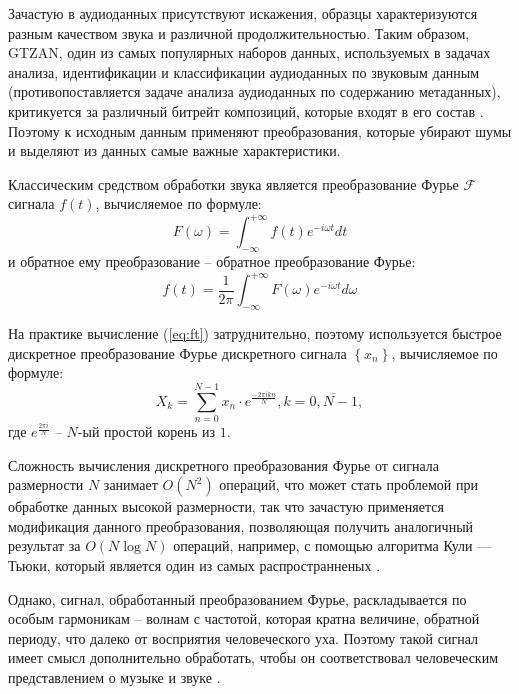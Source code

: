 Зачастую в аудиоданных присутствуют искажения, образцы характеризуются разным качеством звука и различной продолжительностью. 
Таким образом, GTZAN, один из самых популярных наборов данных, используемых в задачах анализа, идентификации и классификации аудиоданных по
звуковым данным (противопоставляется задаче анализа аудиоданных по содержанию метаданных), критикуется за различный битрейт композиций, которые входят в его состав \cite{gtzan}.
Поэтому к исходным данным применяют преобразования, которые убирают шумы и выделяют из данных самые важные характеристики.

Классическим средством обработки звука является преобразование Фурье $\mathcal{F}$ сигнала $f(t)$, вычисляемое по формуле:
\begin{equation} \label{eq:ft}
	F(\omega) = \int_{-\infty}^{+\infty} f(t) e ^ {-i \omega t} dt
\end{equation} и обратное ему преобразование -- обратное преобразование Фурье:
\begin{equation}
	f(t) = \frac{1}{2\pi} \int_{-\infty}^{+\infty} F(\omega) e^{-i \omega t} d\omega
\end{equation}

На практике вычисление (\ref{eq:ft}) затруднительно, поэтому используется быстрое дискретное преобразование Фурье дискретного сигнала $\left\{x_n\right\}$, вычисляемое по формуле:
\begin{equation}
	X_k = \sum_{n=0}^{N-1} x_n \cdot e^\frac{-2\pi i kn}{N}, k=\overline{0, N-1},
\end{equation}
где $e^{\frac{2\pi i}{N}}$ -- $N$-ый простой корень из $1$.

Сложность вычисления дискретного преобразования Фурье от сигнала размерности $N$ занимает $O(N^2)$ операций, что может стать проблемой при обработке
данных высокой размерности, так что зачастую применяется модификация данного преобразования, позволяющая получить аналогичный результат
за $O(N\log N )$ операций, например, с помощью алгоритма Кули — Тьюки, который является один из самых распространненых \cite{fft}.

Однако, сигнал, обработанный преобразованием Фурье, раскладывается по особым гармоникам -- волнам с частотой, которая кратна величине, обратной периоду, что далеко от восприятия человеческого уха.
Поэтому такой сигнал имеет смысл дополнительно обработать, чтобы он соответствовал человеческим представлением о музыке и звуке \cite{cyber_zub}.

